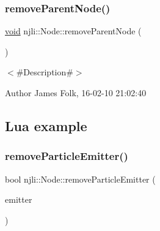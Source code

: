 \begin{DoxyCodeInclude}
\end{DoxyCodeInclude}
\mbox{\label{classnjli_1_1_node_ac2ea52a338582bd41fef29230107049a}} 
\subsubsection{\texorpdfstring{remove\+Parent\+Node()}{removeParentNode()}}
{\footnotesize\ttfamily \mbox{\hyperlink{_thread_8h_af1e856da2e658414cb2456cb6f7ebc66}{void}} njli\+::\+Node\+::remove\+Parent\+Node (\begin{DoxyParamCaption}{ }\end{DoxyParamCaption})}



$<$\#\+Description\#$>$ 

\begin{DoxyAuthor}{Author}
James Folk, 16-\/02-\/10 21\+:02\+:40
\end{DoxyAuthor}
\hypertarget{classnjli_1_1_steering_behavior_wander_ex1}{}\subsection{Lua example}\label{classnjli_1_1_steering_behavior_wander_ex1}

\begin{DoxyCodeInclude}
\end{DoxyCodeInclude}
\mbox{\label{classnjli_1_1_node_ae08c22d2d4b832972e97072b4b7ae140}} 
\subsubsection{\texorpdfstring{remove\+Particle\+Emitter()}{removeParticleEmitter()}}
{\footnotesize\ttfamily bool njli\+::\+Node\+::remove\+Particle\+Emitter (\begin{DoxyParamCaption}\item[{\mbox{\hyperlink{classnjli_1_1_particle_emitter}{Particle\+Emitter}} $\ast$}]{emitter }\end{DoxyParamCaption})}



